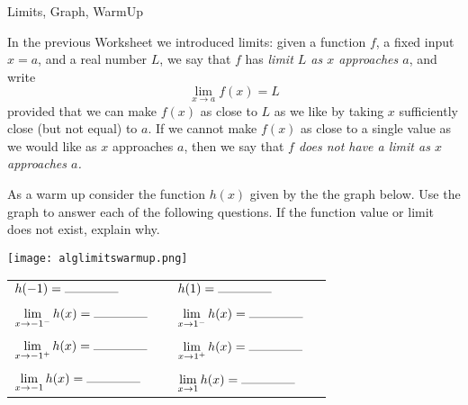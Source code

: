 

\begin{tagblock}{Limits, Graph, WarmUp}
\begin{question}
	In the previous Worksheet we introduced limits: given a function $f$, a fixed input $x=a$, and a real number $L$, we say that $f$ has  \emph{limit $L$ as $x$ approaches $a$}, and write 
\[\lim_{x \to a}f(x) = L\]
provided that we can make $f(x)$ as close to $L$ as we like by taking $x$ sufficiently close (but not equal) to $a$. If we cannot make $f(x)$ as close to a single value as we would like as $x$ approaches $a$, then we say that \emph{$f$ does not have a limit as $x$ approaches $a$.}




As a warm up consider the function $h(x)$ given by the the graph below. Use the graph to answer each of the following questions.  If the function value or limit does not exist, explain why.


\begin{minipage}{.5\textwidth}
\texttt{[image: alglimitswarmup.png]}\end{minipage}

\begin{minipage}{.5\textwidth}
\begin{tabular}{llll}
   $h(-1) =  \rule{1.5cm}{.1mm}$ & \hspace{.2in} & $h(1) =  \rule{1.5cm}{.1mm}$  & \hspace{1in}   \\ \\
  $\displaystyle \lim_{x \to -1^-} h(x) =  \rule{1.5cm}{.1mm}$ &\hspace{.2in} &  $\displaystyle \lim_{x \to 1^-} h(x) =  \rule{1.5cm}{.1mm}$ & \hspace{.2in} \\ \\ 
   $\displaystyle \lim_{x \to -1^+} h(x) =  \rule{1.5cm}{.1mm}$ &\hspace{.2in}  &  $\displaystyle \lim_{x \to 1^+} h(x) =  \rule{1.5cm}{.1mm}$ & \hspace{.2in} \\ \\
  $\displaystyle \lim_{x \to -1} h(x) =  \rule{1.5cm}{.1mm}$ &\hspace{.2in}  &  $\displaystyle \lim_{x \to 1} h(x) =  \rule{1.5cm}{.1mm}$ & \hspace{.2in}  \\
  \end{tabular}
\end{minipage}  



\end{question}
\end{tagblock}

